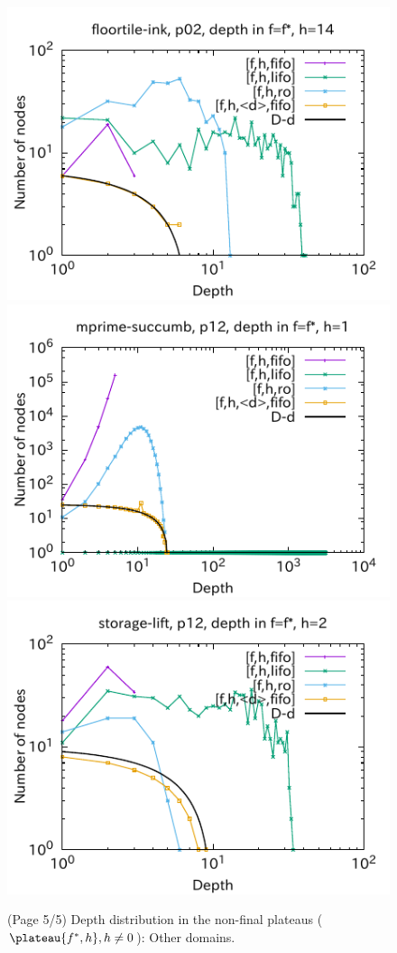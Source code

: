 \begin{figure}[htbp]
\includegraphics{img/output-lmcut/floortile-ink/p02-14.pdf}
\includegraphics{img/output-lmcut/mprime-succumb/p12-1.pdf}
\includegraphics{img/output-lmcut/storage-lift/p12-2.pdf}
 \caption{(Page 5/5) Depth distribution in the non-final plateaus ($\plateau{f^*,h}, h\not=0$): Other domains.}
 \label{fig:depth-histogram5}
\end{figure}
